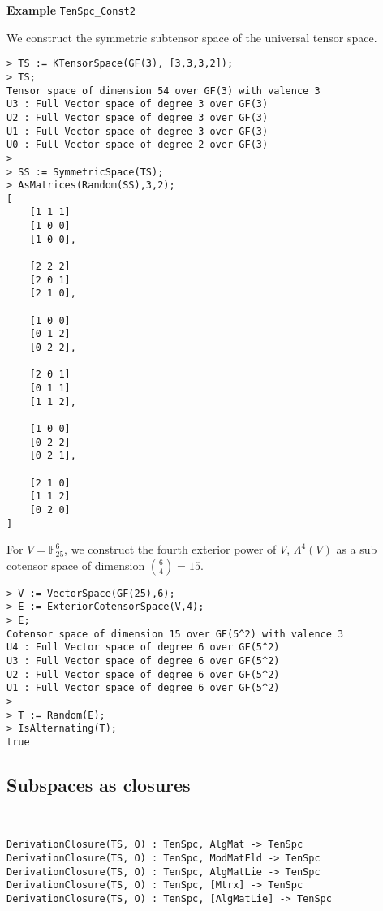 \begin{framed}{\bf Example} {\tt TenSpc\_Const2}\\
{\small We construct the symmetric subtensor space of the universal tensor space.
\begin{lstlisting}[frame=single,basicstyle=\ttfamily\color{black!30!
teal},backgroundcolor=\color{white!70!gray}]
> TS := KTensorSpace(GF(3), [3,3,3,2]);
> TS;
Tensor space of dimension 54 over GF(3) with valence 3
U3 : Full Vector space of degree 3 over GF(3)
U2 : Full Vector space of degree 3 over GF(3)
U1 : Full Vector space of degree 3 over GF(3)
U0 : Full Vector space of degree 2 over GF(3)
> 
> SS := SymmetricSpace(TS);
> AsMatrices(Random(SS),3,2);
[
    [1 1 1]
    [1 0 0]
    [1 0 0],

    [2 2 2]
    [2 0 1]
    [2 1 0],

    [1 0 0]
    [0 1 2]
    [0 2 2],

    [2 0 1]
    [0 1 1]
    [1 1 2],

    [1 0 0]
    [0 2 2]
    [0 2 1],

    [2 1 0]
    [1 1 2]
    [0 2 0]
]
\end{lstlisting}
For $V=\mathbb{F}_{25}^6$, we construct the fourth exterior power of $V$, $\Lambda^4(V)$ 
as a sub cotensor space of dimension $\binom{6}{4}=15$.
\begin{lstlisting}[frame=single,basicstyle=\ttfamily\color{black!30!
teal},backgroundcolor=\color{white!70!gray}]
> V := VectorSpace(GF(25),6);
> E := ExteriorCotensorSpace(V,4);
> E;
Cotensor space of dimension 15 over GF(5^2) with valence 3
U4 : Full Vector space of degree 6 over GF(5^2)
U3 : Full Vector space of degree 6 over GF(5^2)
U2 : Full Vector space of degree 6 over GF(5^2)
U1 : Full Vector space of degree 6 over GF(5^2)
> 
> T := Random(E);
> IsAlternating(T);
true
\end{lstlisting} }
\end{framed}

\subsection{Subspaces as closures}~

\color{blue}
{\small \begin{verbatim}
DerivationClosure(TS, O) : TenSpc, AlgMat -> TenSpc
DerivationClosure(TS, O) : TenSpc, ModMatFld -> TenSpc
DerivationClosure(TS, O) : TenSpc, AlgMatLie -> TenSpc
DerivationClosure(TS, O) : TenSpc, [Mtrx] -> TenSpc
DerivationClosure(TS, O) : TenSpc, [AlgMatLie] -> TenSpc
\end{verbatim} }
\color{black}

